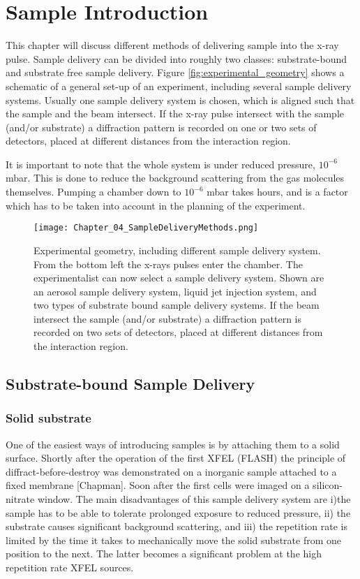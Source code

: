 \chapter{Sample Introduction}
This chapter will discuss different methods of delivering sample into the x-ray pulse. Sample delivery can be divided into roughly two classes: substrate-bound and substrate free sample delivery. Figure \ref{fig:experimental_geometry} shows a schematic of a general set-up of an experiment, including several sample delivery systems. Usually one sample delivery system is chosen, which is aligned such that the sample and the beam intersect. If the x-ray pulse intersect with the sample (and/or substrate) a diffraction pattern is recorded on one or two sets of detectors, placed at different distances from the interaction region.

It is important to note that the whole system is under reduced pressure, $10^{-6}$ mbar. This is done to reduce the background scattering from the gas molecules themselves. Pumping a chamber down to $10^{-6}$ mbar takes hours, and is a factor which has to be taken into account in the planning of the experiment. 

\begin{figure}[h]\label{fig:sample_delivery_methods}
\centering 
\texttt{[image: Chapter\_04\_SampleDeliveryMethods.png]}
\caption{Experimental geometry, including different sample delivery system. From the bottom left the x-rays pulses enter the chamber. The experimentalist can now select a sample delivery system. Shown are an aerosol sample delivery system, liquid jet injection system, and two types of substrate bound sample delivery systems. If the beam intersect the sample (and/or substrate) a diffraction pattern is recorded on two sets of detectors, placed at different distances from the interaction region.}
\end{figure}

\section{Substrate-bound Sample Delivery}
\subsection{Solid substrate}
One of the easiest ways of introducing samples is by attaching them to a solid surface. Shortly after the operation of the first XFEL (FLASH) the principle of diffract-before-destroy was demonstrated on a inorganic sample attached to a fixed membrane [Chapman]. Soon after the first cells were imaged on a silicon-nitrate window. The main disadvantages of this sample delivery system are i)the sample has to be able to tolerate prolonged exposure to reduced pressure, ii) the substrate causes significant background scattering, and iii) the repetition rate is limited by the time it takes to mechanically move the solid substrate from one position to the next. The latter becomes a significant problem at the high repetition rate XFEL sources.

